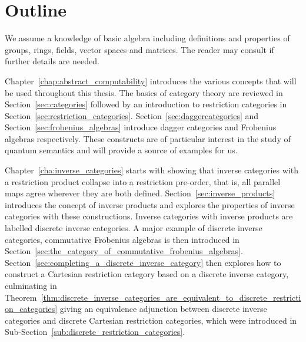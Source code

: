 \section{Outline} %
\label{sec:outline}

We assume a knowledge of basic algebra including definitions and properties of groups, rings,
fields, vector spaces and matrices. The reader may consult \cite{lang:algebra} if further details
are needed.

Chapter~\ref{chap:abstract_computability} introduces the various concepts that will be used
throughout this thesis. The basics of category theory are reviewed in Section~\ref{sec:categories}
followed by an introduction to restriction categories in
Section~\ref{sec:restriction_categories}. Section~\ref{sec:daggercategories} and
Section~\ref{sec:frobenius_algebras}  introduce dagger categories and Frobenius
algebras respectively. These constructs are of particular interest in the study of quantum semantics
and will provide a source of examples for us.

Chapter~\ref{cha:inverse_categories} starts with showing that inverse categories with a restriction
product collapse into a restriction pre-order, that is, all parallel maps agree wherever they are
both defined. Section~\ref{sec:inverse_products} introduces the concept of inverse products and
explores the properties of inverse categories with these constructions. Inverse categories with
inverse products are labelled discrete inverse categories. A major example of discrete inverse
categories, commutative Frobenius algebras is then introduced in
Section~\ref{sec:the_category_of_commutative_frobenius_algebras}.
Section~\ref{sec:completing_a_discrete_inverse_category} then explores how to construct a Cartesian
restriction category based on a discrete inverse category, culminating in
Theorem~\ref{thm:discrete_inverse_categories_are_equivalent_to_discrete_restriction_categories}
giving an equivalence adjunction between discrete inverse categories and discrete Cartesian
restriction categories, which were introduced in Sub-Section~\ref{sub:discrete_restriction_categories}.

